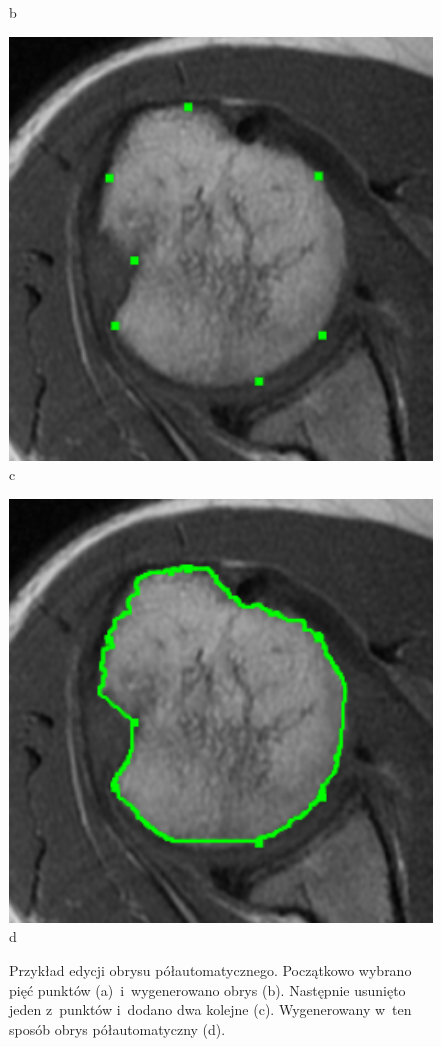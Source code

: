 \documentclass[a4paper,11pt,twoside,openright]{report}
\theoremstyle{definition}
\begin{document}
\begin{figure}[h!]
\begin{center}
\begin{center}
		b
	\end{center}
	\endminipage\hfill
	\begin{center}
		\includegraphics[width=1.0\textwidth]{148}
		c
	\end{center}
	\endminipage\hfill
	\begin{center}
		\includegraphics[width=1.0\textwidth]{149}
		d
	\end{center}
	\endminipage\hfill
	\caption{Przykład edycji obrysu półautomatycznego. Początkowo wybrano pięć punktów 
	(a)~i~wygenerowano obrys (b). Następnie usunięto jeden z~punktów i~dodano dwa kolejne (c). 
	Wygenerowany w~ten sposób obrys półautomatyczny (d).}
	\label{fig:146}
\end{center}
\end{figure}
\end{document}
